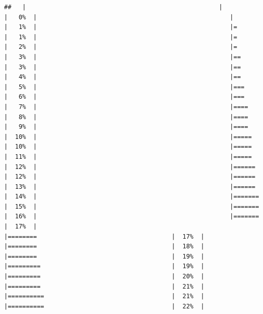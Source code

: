 \documentclass[
  krantz2]{krantz}
\begin{document}
\begin{verbatim}
##   |                                                     |                                             |   0%  |                                                     |                                             |   1%  |                                                     |=                                            |   1%  |                                                     |=                                            |   2%  |                                                     |=                                            |   3%  |                                                     |==                                           |   3%  |                                                     |==                                           |   4%  |                                                     |==                                           |   5%  |                                                     |===                                          |   6%  |                                                     |===                                          |   7%  |                                                     |====                                         |   8%  |                                                     |====                                         |   9%  |                                                     |====                                         |  10%  |                                                     |=====                                        |  10%  |                                                     |=====                                        |  11%  |                                                     |=====                                        |  12%  |                                                     |======                                       |  12%  |                                                     |======                                       |  13%  |                                                     |======                                       |  14%  |                                                     |=======                                      |  15%  |                                                     |=======                                      |  16%  |                                                     |=======                                      |  17%  |                                                     |========                                     |  17%  |                                                     |========                                     |  18%  |                                                     |========                                     |  19%  |                                                     |=========                                    |  19%  |                                                     |=========                                    |  20%  |                                                     |=========                                    |  21%  |                                                     |==========                                   |  21%  |                                                     |==========                                   |  22%  |         
\end{verbatim}
\end{document}
